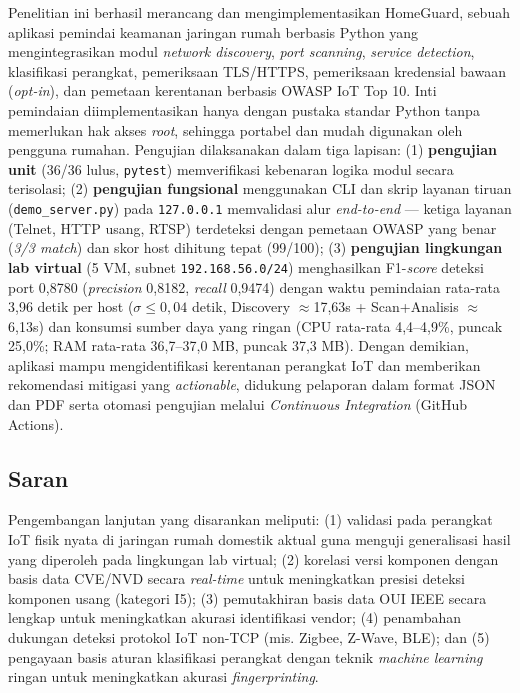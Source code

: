 \documentclass[conference]{IEEEtran}
\begin{document}
Penelitian ini berhasil merancang dan mengimplementasikan HomeGuard, sebuah aplikasi pemindai keamanan jaringan rumah berbasis Python yang mengintegrasikan modul \textit{network discovery}, \textit{port scanning}, \textit{service detection}, klasifikasi perangkat, pemeriksaan TLS/HTTPS, pemeriksaan kredensial bawaan (\textit{opt-in}), dan pemetaan kerentanan berbasis OWASP IoT Top 10. Inti pemindaian diimplementasikan hanya dengan pustaka standar Python tanpa memerlukan hak akses \textit{root}, sehingga portabel dan mudah digunakan oleh pengguna rumahan. Pengujian dilaksanakan dalam tiga lapisan: (1) \textbf{pengujian unit} (36/36 lulus, \texttt{pytest}) memverifikasi kebenaran logika modul secara terisolasi; (2) \textbf{pengujian fungsional} menggunakan CLI dan skrip layanan tiruan (\texttt{demo\_server.py}) pada \texttt{127.0.0.1} memvalidasi alur \textit{end-to-end} --- ketiga layanan (Telnet, HTTP usang, RTSP) terdeteksi dengan pemetaan OWASP yang benar (\textit{3/3 match}) dan skor host dihitung tepat (99/100); (3) \textbf{pengujian lingkungan lab virtual} (5 VM, subnet \texttt{192.168.56.0/24}) menghasilkan F1-\textit{score} deteksi port 0,8780 (\textit{precision} 0,8182, \textit{recall} 0,9474) dengan waktu pemindaian rata-rata 3,96 detik per host ($\sigma \leq 0{,}04$ detik, Discovery $\approx$17,63s + Scan+Analisis $\approx$6,13s) dan konsumsi sumber daya yang ringan (CPU rata-rata 4,4--4,9\%, puncak 25,0\%; RAM rata-rata 36,7--37,0 MB, puncak 37,3 MB). Dengan demikian, aplikasi mampu mengidentifikasi kerentanan perangkat IoT dan memberikan rekomendasi mitigasi yang \textit{actionable}, didukung pelaporan dalam format JSON dan PDF serta otomasi pengujian melalui \textit{Continuous Integration} (GitHub Actions).

\subsection{Saran}

Pengembangan lanjutan yang disarankan meliputi: (1) validasi pada perangkat IoT fisik nyata di jaringan rumah domestik aktual guna menguji generalisasi hasil yang diperoleh pada lingkungan lab virtual; (2) korelasi versi komponen dengan basis data CVE/NVD secara \textit{real-time} untuk meningkatkan presisi deteksi komponen usang (kategori I5); (3) pemutakhiran basis data OUI IEEE secara lengkap untuk meningkatkan akurasi identifikasi vendor; (4) penambahan dukungan deteksi protokol IoT non-TCP (mis. Zigbee, Z-Wave, BLE); dan (5) pengayaan basis aturan klasifikasi perangkat dengan teknik \textit{machine learning} ringan untuk meningkatkan akurasi \textit{fingerprinting}.
\end{document}
